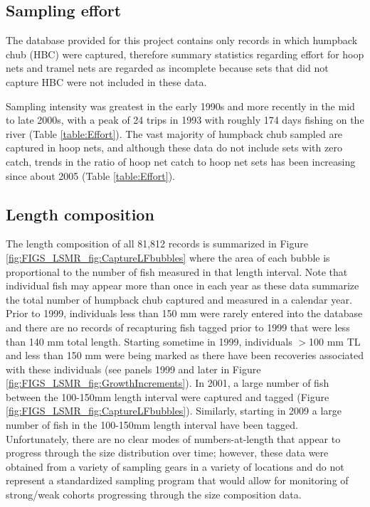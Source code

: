 
\subsection{Sampling effort} %
\label{sub:sampling_effort}
The database provided for this project contains only records in which humpback chub (HBC) were captured, therefore summary statistics regarding effort for hoop nets and tramel nets are regarded as incomplete because sets that did not capture HBC were not included in these data.

Sampling intensity was greatest in the early 1990s and more recently in the mid to late 2000s, with a peak of 24 trips in 1993 with roughly 174 days fishing on the river (Table \ref{table:Effort}).  The vast majority of humpback chub sampled are captured in hoop nets, and although these data do not include sets with zero catch, trends in the ratio of hoop net catch to hoop net sets has been increasing since about 2005 (Table \ref{table:Effort}).





\subsection{Length composition} %
\label{sub:length_composition}

The length composition of all 81,812 records is summarized in Figure \ref{fig:FIGS_LSMR_fig:CaptureLFbubbles} where the area of each bubble is proportional to the number of fish measured in that length interval.  Note that individual fish may appear more than once in each year as these data summarize the total number of humpback chub captured and measured in a calendar year.  Prior to 1999, individuals less than 150 mm were rarely entered into the database and there are no records of recapturing fish tagged prior to 1999 that were less than 140 mm total length.  Starting sometime in 1999, individuals $>$100 mm TL and less than 150 mm were being marked as there have been recoveries associated with these individuals (see panels 1999 and later in Figure \ref{fig:FIGS_LSMR_fig:GrowthIncrements}).  In 2001, a large number of fish between the 100-150mm length interval were captured and tagged (Figure \ref{fig:FIGS_LSMR_fig:CaptureLFbubbles}).  Similarly, starting in 2009 a large number of fish in the 100-150mm length interval have been tagged.  Unfortunately, there are no clear modes of numbers-at-length that appear to progress through the size distribution over time; however, these data were obtained from a variety of sampling gears in a variety of locations and do not represent a standardized sampling program that would allow for monitoring of strong/weak cohorts progressing through the size composition data.

